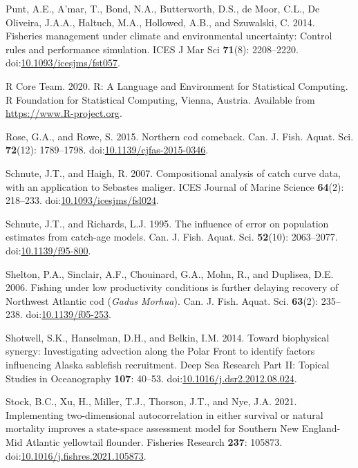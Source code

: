 \documentclass[]{article}
\begin{document}
\leavevmode\hypertarget{ref-punt2014Fisheries}{}%
Punt, A.E., A'mar, T., Bond, N.A., Butterworth, D.S., de Moor, C.L., De
Oliveira, J.A.A., Haltuch, M.A., Hollowed, A.B., and Szuwalski, C. 2014.
Fisheries management under climate and environmental uncertainty:
Control rules and performance simulation. ICES J Mar Sci \textbf{71}(8):
2208--2220.
doi:\href{https://doi.org/10.1093/icesjms/fst057}{10.1093/icesjms/fst057}.

\leavevmode\hypertarget{ref-rcoreteam2020Language}{}%
R Core Team. 2020. R: A Language and Environment for Statistical
Computing. R Foundation for Statistical Computing, Vienna, Austria.
Available from \url{https://www.R-project.org}.

\leavevmode\hypertarget{ref-rose2015Northern}{}%
Rose, G.A., and Rowe, S. 2015. Northern cod comeback. Can. J. Fish.
Aquat. Sci. \textbf{72}(12): 1789--1798.
doi:\href{https://doi.org/10.1139/cjfas-2015-0346}{10.1139/cjfas-2015-0346}.

\leavevmode\hypertarget{ref-schnute2007Compositional}{}%
Schnute, J.T., and Haigh, R. 2007. Compositional analysis of catch curve
data, with an application to Sebastes maliger. ICES Journal of Marine
Science \textbf{64}(2): 218--233.
doi:\href{https://doi.org/10.1093/icesjms/fsl024}{10.1093/icesjms/fsl024}.

\leavevmode\hypertarget{ref-schnute1995Influence}{}%
Schnute, J.T., and Richards, L.J. 1995. The influence of error on
population estimates from catch-age models. Can. J. Fish. Aquat. Sci.
\textbf{52}(10): 2063--2077.
doi:\href{https://doi.org/10.1139/f95-800}{10.1139/f95-800}.

\leavevmode\hypertarget{ref-shelton2006Fishing}{}%
Shelton, P.A., Sinclair, A.F., Chouinard, G.A., Mohn, R., and Duplisea,
D.E. 2006. Fishing under low productivity conditions is further delaying
recovery of Northwest Atlantic cod (\emph{Gadus} \emph{Morhua}). Can. J.
Fish. Aquat. Sci. \textbf{63}(2): 235--238.
doi:\href{https://doi.org/10.1139/f05-253}{10.1139/f05-253}.

\leavevmode\hypertarget{ref-shotwell2014Biophysical}{}%
Shotwell, S.K., Hanselman, D.H., and Belkin, I.M. 2014. Toward
biophysical synergy: Investigating advection along the Polar Front to
identify factors influencing Alaska sablefish recruitment. Deep Sea
Research Part II: Topical Studies in Oceanography \textbf{107}: 40--53.
doi:\href{https://doi.org/10.1016/j.dsr2.2012.08.024}{10.1016/j.dsr2.2012.08.024}.

\leavevmode\hypertarget{ref-stock2021Implementing}{}%
Stock, B.C., Xu, H., Miller, T.J., Thorson, J.T., and Nye, J.A. 2021.
Implementing two-dimensional autocorrelation in either survival or
natural mortality improves a state-space assessment model for Southern
New England-Mid Atlantic yellowtail flounder. Fisheries Research
\textbf{237}: 105873.
doi:\href{https://doi.org/10.1016/j.fishres.2021.105873}{10.1016/j.fishres.2021.105873}.
\end{document}
